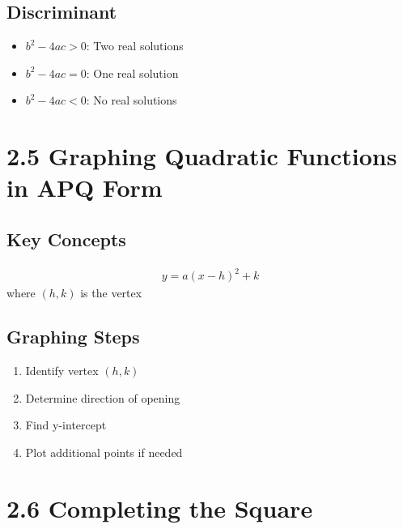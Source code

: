 \documentclass[12pt]{article}
\begin{document}
\subsection*{Discriminant}
\begin{tcolorbox}[colback=lightgray,colframe=secondary,title=Discriminant Analysis]
    \begin{itemize}
        \item $b^2 - 4ac > 0$: Two real solutions
        \item $b^2 - 4ac = 0$: One real solution
        \item $b^2 - 4ac < 0$: No real solutions
    \end{itemize}
\end{tcolorbox}

\section{2.5 Graphing Quadratic Functions in APQ Form}
\subsection*{Key Concepts}
\begin{tcolorbox}[colback=lightgray,colframe=primary,title=Vertex Form]
    \begin{align*}
        y = a(x - h)^2 + k
    \end{align*}
    where $(h,k)$ is the vertex
\end{tcolorbox}

\subsection*{Graphing Steps}
\begin{tcolorbox}[colback=lightgray,colframe=secondary,title=Steps to Graph]
    \begin{enumerate}
        \item Identify vertex $(h,k)$
        \item Determine direction of opening
        \item Find y-intercept
        \item Plot additional points if needed
    \end{enumerate}
\end{tcolorbox}

\section{2.6 Completing the Square}
\end{document}
